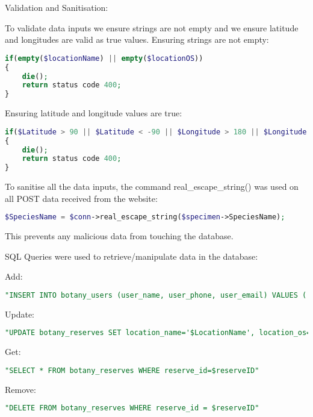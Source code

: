         Validation and Sanitisation:

        To validate data inputs we ensure strings are not empty and we ensure latitude and longitudes are valid as true values. Ensuring strings are not empty: 
        
        \begin{lstlisting}[language=php]
if(empty($locationName) || empty($locationOS))
{
    die();
    return status code 400;
}
        \end{lstlisting}

        Ensuring latitude and longitude values are true:
    
        \begin{lstlisting}[language=php]
if($Latitude > 90 || $Latitude < -90 || $Longitude > 180 || $Longitude < -180)
{
    die();
    return status code 400;
}
        \end{lstlisting}

        To sanitise all the data inputs, the command real\_escape\_string() was used on all POST data received from the website: 
        
        \begin{lstlisting}[language=php]
$SpeciesName = $conn->real_escape_string($specimen->SpeciesName);
        \end{lstlisting}
        
        This prevents any malicious data from touching the database.

        SQL Queries were used to retrieve/manipulate data in the database:

        Add:
        \begin{lstlisting}[language=sql]
"INSERT INTO botany_users (user_name, user_phone, user_email) VALUES ('$UserName', '$UserPhone', '$UserEmail')"
        \end{lstlisting}

        Update:
        \begin{lstlisting}[language=sql]
"UPDATE botany_reserves SET location_name='$LocationName', location_os='$LocationOS', description='$Description' WHERE reserve_id = $ReserveID"
        \end{lstlisting}
            
        Get:
        \begin{lstlisting}[language=sql]
"SELECT * FROM botany_reserves WHERE reserve_id=$reserveID"
        \end{lstlisting}
        
        Remove:
        \begin{lstlisting}[language=sql]
"DELETE FROM botany_reserves WHERE reserve_id = $reserveID"
        \end{lstlisting}

